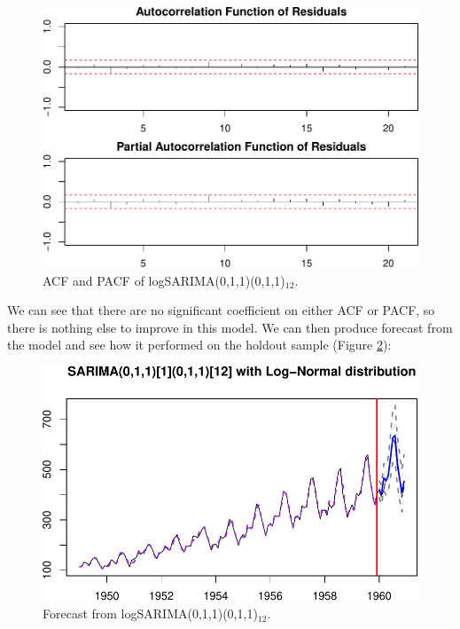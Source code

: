 \documentclass[
]{book}
\newenvironment{Shaded}{\begin{snugshade}}{\end{snugshade}}
\newcommand{\AttributeTok}[1]{\textcolor[rgb]{0.77,0.63,0.00}{#1}}
\newcommand{\DecValTok}[1]{\textcolor[rgb]{0.00,0.00,0.81}{#1}}
\newcommand{\FunctionTok}[1]{\textcolor[rgb]{0.00,0.00,0.00}{#1}}
\newcommand{\NormalTok}[1]{#1}
\newcommand{\SpecialCharTok}[1]{\textcolor[rgb]{0.00,0.00,0.00}{#1}}
\newcommand{\StringTok}[1]{\textcolor[rgb]{0.31,0.60,0.02}{#1}}
\theoremstyle{definition}
\theoremstyle{definition}
\theoremstyle{definition}
\theoremstyle{definition}
\theoremstyle{remark}
\begin{document}
\begin{figure}
\centering
\includegraphics{Svetunkov--2022----ADAM_files/figure-latex/logSARIMAACF-1.pdf}
\caption{\label{fig:logSARIMAACF}ACF and PACF of logSARIMA(0,1,1)(0,1,1)\(_{12}\).}
\end{figure}

We can see that there are no significant coefficient on either ACF or PACF, so there is nothing else to improve in this model. We can then produce forecast from the model and see how it performed on the holdout sample (Figure \ref{fig:logSARIMAForecast}):

\begin{Shaded}
\end{Shaded}

\begin{figure}
\centering
\includegraphics{Svetunkov--2022----ADAM_files/figure-latex/logSARIMAForecast-1.pdf}
\caption{\label{fig:logSARIMAForecast}Forecast from logSARIMA(0,1,1)(0,1,1)\(_{12}\).}
\end{figure}
\end{document}
